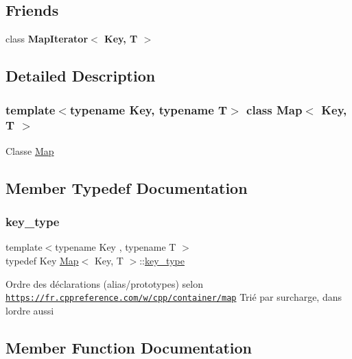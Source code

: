 \subsection*{Friends}
\begin{DoxyCompactItemize}
\item 
\mbox{\label{classMap_ab0161446224830e3b2e9a36310acb4ae}} 
class {\bfseries Map\+Iterator$<$ Key, T $>$}
\end{DoxyCompactItemize}


\subsection{Detailed Description}
\subsubsection*{template$<$typename Key, typename T$>$\newline
class Map$<$ Key, T $>$}

Classe \hyperlink{classMap}{Map} 

\subsection{Member Typedef Documentation}
\mbox{\label{classMap_a430e42d1c6a02e95eb3a34626e313441}} 
\subsubsection{\texorpdfstring{key\+\_\+type}{key\_type}}
{\footnotesize\ttfamily template$<$typename Key , typename T $>$ \\
typedef Key \hyperlink{classMap}{Map}$<$ Key, T $>$\+::\hyperlink{classMap_a430e42d1c6a02e95eb3a34626e313441}{key\+\_\+type}}

Ordre des déclarations (alias/prototypes) selon \href{https://fr.cppreference.com/w/cpp/container/map}{\tt https\+://fr.\+cppreference.\+com/w/cpp/container/map} Trié par surcharge, dans l\textquotesingle{}ordre aussi 

\subsection{Member Function Documentation}
\mbox{\label{classMap_a87d125f634066766b87aae4092692453}} 
